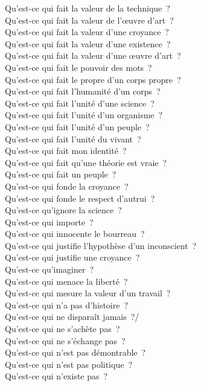 \documentclass[a4paper,12pt]{article}
\begin{document}
Qu'est-ce qui fait la valeur de la technique ? \\
Qu'est-ce qui fait la valeur de l'œuvre d'art ? \\
Qu'est-ce qui fait la valeur d'une croyance ? \\
Qu'est-ce qui fait la valeur d'une existence ? \\
Qu'est-ce qui fait la valeur d'une œuvre d'art ? \\
Qu'est-ce qui fait le pouvoir des mots ? \\
Qu'est-ce qui fait le propre d'un corps propre ? \\
Qu'est-ce qui fait l'humanité d'un corps ? \\
Qu'est-ce qui fait l'unité d'une science ? \\
Qu'est-ce qui fait l'unité d'un organisme ? \\
Qu'est-ce qui fait l'unité d'un peuple ? \\
Qu'est-ce qui fait l'unité du vivant ? \\
Qu'est-ce qui fait mon identité ? \\
Qu'est-ce qui fait qu'une théorie est vraie ? \\
Qu'est-ce qui fait un peuple ? \\
Qu'est-ce qui fonde la croyance ? \\
Qu'est-ce qui fonde le respect d'autrui ? \\
Qu'est-ce qu'ignore la science ? \\
Qu'est-ce qui importe ? \\
Qu'est-ce qui innocente le bourreau ? \\
Qu'est-ce qui justifie l'hypothèse d'un inconscient ? \\
Qu'est-ce qui justifie une croyance ? \\
Qu'est-ce qu'imaginer ? \\
Qu'est-ce qui menace la liberté ? \\
Qu'est-ce qui mesure la valeur d'un travail ? \\
Qu'est-ce qui n'a pas d'histoire ? \\
Qu'est-ce qui ne disparaît jamais ?/ \\
Qu'est-ce qui ne s'achète pas ? \\
Qu'est-ce qui ne s'échange pas ? \\
Qu'est-ce qui n'est pas démontrable ? \\
Qu'est-ce qui n'est pas politique ? \\
Qu'est-ce qui n'existe pas ? \\
\end{document}
